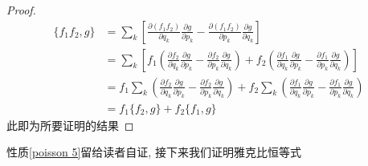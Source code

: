 \documentclass[a4paper,11pt]{book}
\newtheorem{proof}{证明}[section]
\begin{document}
\begin{proof}
  \begin{equation*}
    \begin{split}
       \{f_1f_2,g\}&=\sum_{k}\left[\frac{\partial{(f_1f_2)}}{\partial{q_k}}\frac{\partial g}{\partial{p_k}}-\frac{\partial{(f_1f_2)}}{\partial{p_k}}\frac{\partial g}{\partial{q_k}}\right]\\
         &=\sum_{k}\left[f_1\left(\frac{\partial{f_2}}{\partial{q_k}}\frac{\partial g}{\partial{p_k}}-\frac{\partial{f_2}}{\partial{p_k}}\frac{\partial g}{\partial{q_k}}\right)+f_2\left(\frac{\partial{f_1}}{\partial{q_k}}\frac{\partial g}{\partial{p_k}}-\frac{\partial{f_1}}{\partial{p_k}}\frac{\partial g}{\partial{q_k}}\right)\right]\\
         &=f_1\sum_{k}\left(\frac{\partial{f_2}}{\partial{q_k}}\frac{\partial g}{\partial{p_k}}-\frac{\partial{f_2}}{\partial{p_k}}\frac{\partial g}{\partial{q_k}}\right)+f_2\sum_{k}\left(\frac{\partial{f_1}}{\partial{q_k}}\frac{\partial g}{\partial{p_k}}-\frac{\partial{f_1}}{\partial{p_k}}\frac{\partial g}{\partial{q_k}}\right) \\
         &=f_1\{f_2,g\}+f_2\{f_1,g\}
    \end{split}
  \end{equation*}
  此即为所要证明的结果
\end{proof}
性质\ref{poisson 5}留给读者自证, 接下来我们证明雅克比恒等式
\end{document}
